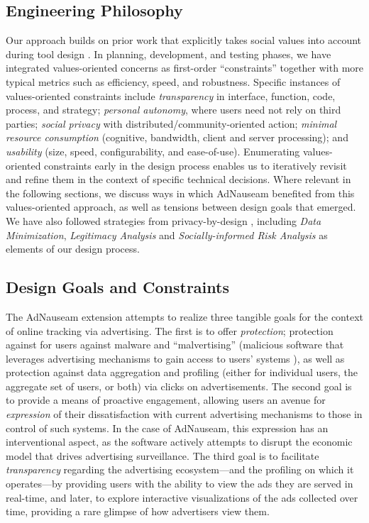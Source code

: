 \documentclass[conference]{IEEEtran}
\begin{document}
\subsection{Engineering Philosophy}

Our approach builds on prior work that explicitly takes social values into account during tool design \cite{Friedman,Flanagan,Howe-1}. In planning, development, and testing phases, we have integrated values-oriented concerns as first-order “constraints” together with more typical metrics such as efficiency, speed, and robustness. Specific instances of values-oriented constraints include \emph{transparency} in interface, function, code, process, and strategy; \emph{personal autonomy}, where users need not rely on third parties; \emph{social privacy} with distributed/community-oriented action; \emph{minimal resource consumption} (cognitive, bandwidth, client and server processing); and \emph{usability} (size, speed, configurability, and ease-of-use). Enumerating values-oriented constraints early in the design process enables us to iteratively revisit and refine them in the context of specific technical decisions. Where relevant in the following sections, we discuss ways in which AdNauseam benefited from this values-oriented approach, as well as tensions between design goals that emerged. We have also followed strategies from privacy-by-design \cite{Gurses-0,Hoepman,Gurses-1,Hansen,Cavoukian}, including \emph{Data Minimization}, \emph{Legitimacy Analysis} and \emph{Socially-informed Risk Analysis} as elements of our design process.

\subsection{Design Goals and Constraints}

The AdNauseam extension attempts to realize three tangible goals for the context of online tracking via advertising. The first is to offer \emph{protection}; protection against for users against malware and “malvertising” (malicious software that leverages advertising mechanisms to gain access to users' systems \cite{Mansfield}), as well as protection against data aggregation and profiling (either for individual users, the aggregate set of users, or both)  via clicks on advertisements. The second goal is to provide a means of proactive engagement, allowing users an avenue for \emph{expression} of their dissatisfaction with current advertising mechanisms to those in control of such systems. In the case of AdNauseam, this expression has an interventional aspect, as the software actively attempts to disrupt the economic model that drives advertising surveillance. The third goal is to facilitate \emph{transparency} regarding the advertising ecosystem---and the profiling on which it operates---by providing users with the ability to view the ads they are served in real-time, and later, to explore interactive visualizations of the ads collected over time, providing a rare glimpse of how advertisers view them.
\end{document}
